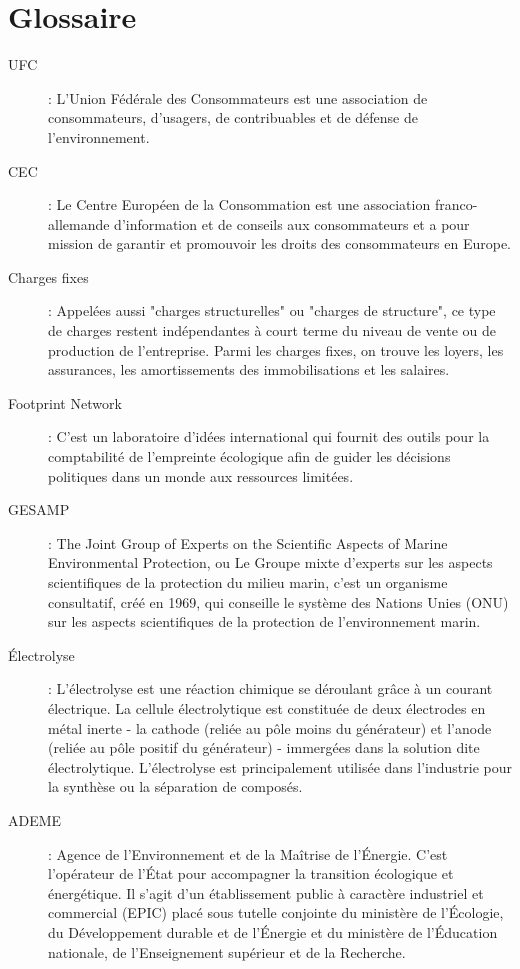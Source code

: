 \chapter{Glossaire}

\begin{description}

\item[UFC] : L'Union Fédérale des Consommateurs est une association de consommateurs, d'usagers, de contribuables et de défense de l'environnement.

\item[CEC] : Le Centre Européen de la Consommation est une association franco-allemande d’information et de conseils aux consommateurs et a pour mission de garantir et promouvoir les droits des consommateurs en Europe.

\item[Charges fixes] : Appelées aussi "charges structurelles" ou "charges de structure", ce type de charges restent indépendantes à court terme du niveau de vente ou de production de l’entreprise. Parmi les charges fixes, on trouve les loyers, les assurances, les amortissements des immobilisations et les salaires.

\item[Footprint Network] : C'est un laboratoire d’idées international qui fournit des outils pour la comptabilité de l'empreinte écologique afin de guider les décisions politiques dans un monde aux ressources limitées.

\item[GESAMP] : The Joint Group of Experts on the Scientific Aspects of Marine Environmental Protection, ou Le Groupe mixte d'experts sur les aspects scientifiques de la protection du milieu marin, c'est un organisme consultatif, créé en 1969, qui conseille le système des Nations Unies (ONU) sur les aspects scientifiques de la protection de l'environnement marin.

\item[Électrolyse] : L’électrolyse est une réaction chimique se déroulant grâce à un courant électrique. La cellule électrolytique est constituée de deux électrodes en métal inerte - la cathode (reliée au pôle moins du générateur) et l'anode (reliée au pôle positif du générateur) - immergées dans la solution dite électrolytique. L'électrolyse est principalement utilisée dans l'industrie pour la synthèse ou la séparation 
de composés.

\item[ADEME] : Agence de l’Environnement et de la Maîtrise de l’Énergie. C'est l'opérateur de l'État pour accompagner la transition écologique et énergétique. Il s'agit d'un établissement public à caractère industriel et commercial (EPIC) placé sous tutelle conjointe du ministère de l’Écologie, du Développement durable et de l’Énergie et du ministère de l’Éducation nationale, de l’Enseignement supérieur et de la Recherche.


\end{description}
